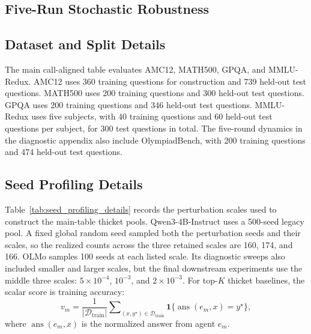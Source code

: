 \documentclass{article}
\begin{document}
\subsection{Five-Run Stochastic Robustness}
\label{app:stochastic_robustness}


\subsection{Dataset and Split Details}
\label{app:dataset_split_details}

The main call-aligned table evaluates AMC12, MATH500, GPQA, and MMLU-Redux.
AMC12 uses 360 training questions for construction and 739 held-out test
questions. MATH500 uses 200 training questions and 300 held-out test questions.
GPQA uses 200 training questions and 346 held-out test questions. MMLU-Redux
uses five subjects, with 40 training questions and 60 held-out test questions
per subject, for 300 test questions in total. The five-round dynamics in the
diagnostic appendix also include OlympiadBench, with 200 training questions and
474 held-out test questions.

\subsection{Seed Profiling Details}
\label{app:seed_profiling_details}

Table~\ref{tab:seed_profiling_details} records the perturbation scales used to
construct the main-table thicket pools. Qwen3-4B-Instruct uses a 500-seed
legacy pool. A fixed global random seed sampled both the perturbation seeds and
their scales, so the realized counts across the three retained scales are 160,
174, and 166. OLMo samples 100 seeds at each listed scale. Its diagnostic sweeps
also included smaller and larger scales, but the final downstream experiments
use the middle three scales: $5\times 10^{-4}$, $10^{-3}$, and
$2\times 10^{-3}$.
For top-$K$ thicket baselines, the scalar score is training accuracy:
\begin{equation}
    v_m
    =
    \frac{1}{|\mathcal D_{\mathrm{train}}|}
    \sum\nolimits_{(x,y^\star)\in\mathcal D_{\mathrm{train}}}
    \mathbf 1\{\operatorname{ans}(e_m,x)=y^\star\},
    \label{eq:thicket_eval}
\end{equation}
where $\operatorname{ans}(e_m,x)$ is the normalized answer from agent $e_m$.
\end{document}
